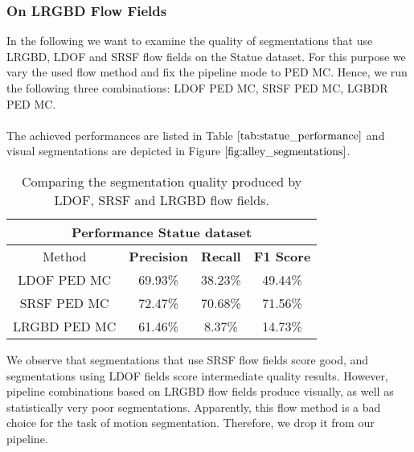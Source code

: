 \subsubsection{On LRGBD Flow Fields}
In the following we want to examine the quality of segmentations that use LRGBD, LDOF and SRSF flow fields on the Statue dataset. For this purpose we vary the used flow method and fix the pipeline mode to PED MC. Hence, we run the following three combinations: LDOF PED MC, SRSF PED MC, LGBDR PED MC. \\ \\
The achieved performances are listed in Table $\ref{tab:statue_performance}$ and visual segmentations are depicted in Figure $\ref{fig:alley_segmentations}$.
\begin{table}[H]
\centering
\begin{tabular}{|c|c|c|c|}
\hline
\multicolumn{4}{|c|}{Performance Statue dataset}                        \\ \hline
Method & \textbf{Precision} & \textbf{Recall} & \textbf{F1 Score} \\ \hline
LDOF PED MC & 69.93\%   & 38.23\%     & 49.44\%  \\ \hline
SRSF PED MC & 72.47\%   & 70.68\%     & 71.56\%  \\ \hline
LRGBD PED MC & 61.46\%   & 8.37\%     & 14.73\%  \\ \hline              
\end{tabular}
\caption[Performance Statue]{Comparing the segmentation quality produced by LDOF, SRSF and LRGBD flow fields.}
\label{tab:statue_performance}
\end{table}
We observe that segmentations that use SRSF flow fields score good, and segmentations using LDOF fields score intermediate quality results. However, pipeline combinations based on LRGBD flow fields produce visually, as well as statistically very poor segmentations. Apparently, this flow method is a bad choice for the task of motion segmentation. Therefore, we drop it from our pipeline. 
